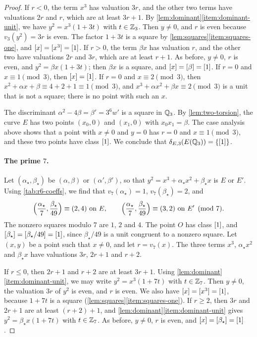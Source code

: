 \begin{proof}
If $r<0$, the term $x^3$ has valuation $3r$, and the other two terms have valuations $2r$ and $r$, which are at least $3r+1$. By \cref{lem:dominant}\ref{item:dominant-unit}, we have $y^2=x^3(1+3t)$ with $t\in\mathbb Z_3$. Then $y\ne0$, and $r$ is even because $v_3(y^2)=3r$ is even. The factor $1+3t$ is a square by \cref{lem:squares}\ref{item:squares-one}, and $[x]=[x^3]=[1]$. If $r>0$, the term $\beta x$ has valuation $r$, and the other two have valuations $2r$ and $3r$, which are at least $r+1$. As before, $y\ne0$, $r$ is even, and $y^2=\beta x(1+3t)$; then $\beta x$ is a square, and $[x]=[\beta]=[1]$. If $r=0$ and $x\equiv1\pmod 3$, then $[x]=[1]$. If $r=0$ and $x\equiv2\pmod3$, then $x^2+\alpha x+\beta\equiv4+2+1\equiv1\pmod 3$, and $x^3+\alpha x^2+\beta x\equiv2\pmod3$ is a unit that is not a square; there is no point with such an $x$.

The discriminant $\alpha^2-4\beta=\beta'=3^6w'$ is a square in $\mathbb Q_3$. By \cref{lem:two-torsion}, the curve $E$ has two points $(x_0,0)$ and $(x_1,0)$ with $x_0x_1=\beta$. The case analysis above shows that a point with $x\ne0$ and $y=0$ has $r=0$ and $x\equiv1\pmod3$, and these two points have class $[1]$. We conclude that $\delta_{E,3}(E(\mathbb Q_3))=\{[1]\}$.

\paragraph{The prime $7$.} Let $(\alpha_\star,\beta_\star)$ be $(\alpha,\beta)$ or $(\alpha',\beta')$, so that $y^2=x^3+\alpha_\star x^2+\beta_\star x$ is $E$ or $E'$. Using \cref{tab:r6-coeffs}, we find that $v_7(\alpha_\star)=1$, $v_7(\beta_\star)=2$, and
\[
\Bigl(\frac{\alpha_\star}{7},\frac{\beta_\star}{49}\Bigr)\equiv(2,4)\ \text{on } E,\qquad \Bigl(\frac{\alpha_\star}{7},\frac{\beta_\star}{49}\Bigr)\equiv(3,2)\ \text{on } E' \pmod 7.
\]
The nonzero squares modulo $7$ are $1$, $2$ and $4$. The point $O$ has class $[1]$, and $[\beta_\star]=[\beta_\star/49]=[1]$, since $\beta_\star/49$ is a unit congruent to a nonzero square. Let $(x,y)$ be a point such that $x\ne0$, and let $r=v_7(x)$. The three terms $x^3$, $\alpha_\star x^2$ and $\beta_\star x$ have valuations $3r$, $2r+1$ and $r+2$.

If $r\le0$, then $2r+1$ and $r+2$ are at least $3r+1$. Using \cref{lem:dominant}\ref{item:dominant-unit}, we may write $y^2=x^3(1+7t)$ with $t\in\mathbb Z_7$. Then $y\ne0$, the valuation $3r$ of $y^2$ is even, and $r$ is even. We also have $[x]=[x^3]=[1]$, because $1+7t$ is a square (\cref{lem:squares}\ref{item:squares-one}). If $r\ge2$, then $3r$ and $2r+1$ are at least $(r+2)+1$, and \cref{lem:dominant}\ref{item:dominant-unit} gives $y^2=\beta_\star x(1+7t)$ with $t\in\mathbb Z_7$. As before, $y\ne0$, $r$ is even, and $[x]=[\beta_\star]=[1]$.


\end{proof}
